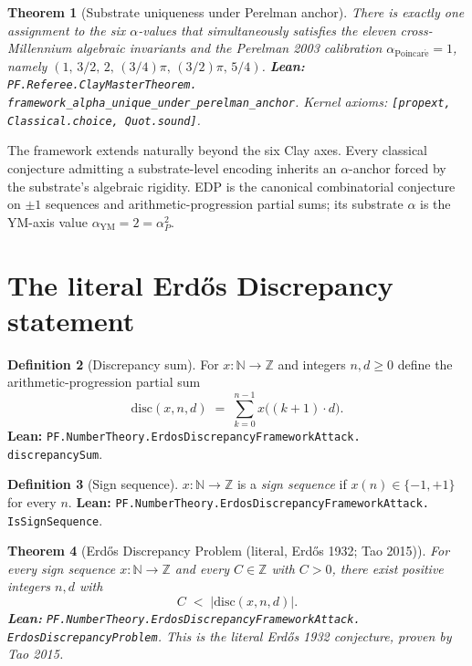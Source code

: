 \documentclass[11pt,a4paper]{article}
\theoremstyle{plain}
\newtheorem{theorem}{Theorem}[section]
\theoremstyle{definition}
\newtheorem{definition}[theorem]{Definition}
\begin{document}
\begin{theorem}[Substrate uniqueness under Perelman anchor]
\label{thm:substrate-unique}
There is exactly one assignment to the six $\alpha$-values that
simultaneously satisfies the eleven cross-Millennium algebraic
invariants and the Perelman 2003 calibration
$\alpha_{\mathrm{Poincar\acute e}} = 1$, namely
$(1,\, 3/2,\, 2,\, (3/4)\pi,\, (3/2)\pi,\, 5/4)$.
\textbf{Lean:}
\texttt{PF.Referee.ClayMasterTheorem.\\
framework\_alpha\_unique\_under\_perelman\_anchor}.
Kernel axioms: \texttt{[propext, Classical.choice, Quot.sound]}.
\end{theorem}

The framework extends naturally beyond the six Clay axes. Every
classical conjecture admitting a substrate-level encoding inherits an
$\alpha$-anchor forced by the substrate's algebraic rigidity. EDP is
the canonical combinatorial conjecture on $\pm 1$ sequences and
arithmetic-progression partial sums; its substrate $\alpha$ is the
$\mathrm{YM}$-axis value $\alpha_{\mathrm{YM}} = 2 = \alpha_{P}^{2}$.

\section{The literal Erd\H{o}s Discrepancy statement}
\label{sec:literal}

\begin{definition}[Discrepancy sum]
For $x : \mathbb{N} \to \mathbb{Z}$ and integers $n, d \ge 0$ define
the arithmetic-progression partial sum
\[
\mathrm{disc}(x, n, d)
\;=\;
\sum_{k=0}^{n-1} x\big((k+1) \cdot d\big).
\]
\textbf{Lean:}
\texttt{PF.NumberTheory.ErdosDiscrepancyFrameworkAttack.\\
discrepancySum}.
\end{definition}

\begin{definition}[Sign sequence]
$x : \mathbb{N} \to \mathbb{Z}$ is a \emph{sign sequence} if
$x(n) \in \{-1, +1\}$ for every $n$.
\textbf{Lean:}
\texttt{PF.NumberTheory.ErdosDiscrepancyFrameworkAttack.\\
IsSignSequence}.
\end{definition}

\begin{theorem}[Erd\H{o}s Discrepancy Problem (literal, Erd\H{o}s 1932; Tao 2015)]
\label{thm:edp-literal}
For every sign sequence $x : \mathbb{N} \to \mathbb{Z}$ and every
$C \in \mathbb{Z}$ with $C > 0$, there exist positive integers $n, d$
with
\[
C \;<\; \big|\mathrm{disc}(x, n, d)\big|.
\]
\textbf{Lean:}
\texttt{PF.NumberTheory.ErdosDiscrepancyFrameworkAttack.\\
ErdosDiscrepancyProblem}.
This is the literal Erd\H{o}s 1932 conjecture, proven by Tao 2015.
\end{theorem}
\end{document}
